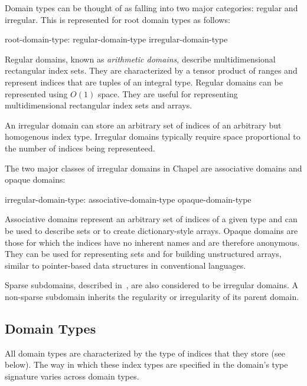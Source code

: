 Domain types can be thought of as falling into two major categories:
regular and irregular.  This is represented for root domain types as
follows:

\begin{syntax}
root-domain-type:
  regular-domain-type
  irregular-domain-type
\end{syntax}

Regular domains, known as \emph{arithmetic domains}, describe
multidimensional rectangular index sets.  They are characterized by a
tensor product of ranges and represent indices that are tuples of an
integral type.  Regular domains can be represented using $O(1)$ space.
They are useful for representing multidimensional rectangular index
sets and arrays.


An irregular domain can store an arbitrary set of indices of an
arbitrary but homogenous index type.  Irregular domains typically
require space proportional to the number of indices being
representeed.

The two major classes of irregular domains in Chapel are associative
domains and opaque domains:

\begin{syntax}
irregular-domain-type:
  associative-domain-type
  opaque-domain-type
\end{syntax}

\noindent Associative domains represent an arbitrary set of indices
of a given type and can be used to describe sets or to create
dictionary-style arrays.  Opaque domains are those for which the
indices have no inherent names and are therefore anonymous.  They can
be used for representing sets and for building unstructured arrays,
similar to pointer-based data structures in conventional languages.

Sparse subdomains, described in~, are also
considered to be irregular domains.  A non-sparse subdomain inherits
the regularity or irregularity of its parent domain.



\subsection{Domain Types}
\label{Domain_Types}

All domain types are characterized by the type of indices that they
store (see~ below).  The way in which these index
types are specified in the domain's type signature varies across
domain types.

